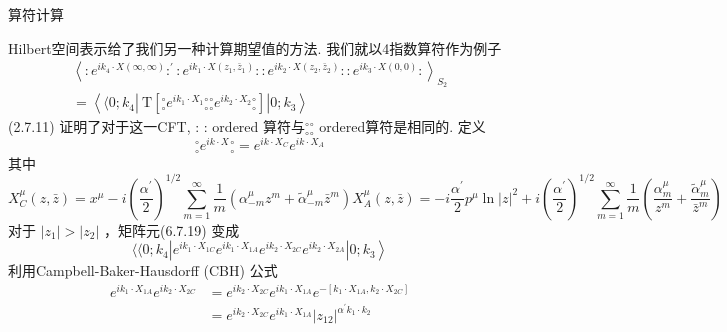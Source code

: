 \centerline{\Large 算符计算}
Hilbert空间表示给了我们另一种计算期望值的方法. 我们就以4指数算符作为例子
\begin{equation}
	\begin{gathered}
		\left\langle: e^{i k_{4} \cdot X(\infty, \infty)}:^{\prime}: e^{i k_{1} \cdot X\left(z_{1}, \bar{z}_{1}\right)}:: e^{i k_{2} \cdot X\left(z_{2}, \bar{z}_{2}\right)}:: e^{i k_{3} \cdot X(0,0)}:\right\rangle_{S_{2}} \\
		=\left\langle\langle 0 ; k_{4}\left|\mathrm{~T}\left[{}_\circ^\circ e^{i k_{1} \cdot X_{1}}{ }_\circ^\circ { }_\circ^\circ e^{i k_{2} \cdot X_{2} }{ }_\circ^\circ \right]\right| 0 ; k_{3}\right\rangle
	\end{gathered}
\end{equation}
(2.7.11) 证明了对于这一CFT, : : ordered 算符与${}_\circ^\circ {}_\circ^\circ$ ordered算符是相同的. 定义
\begin{equation}
	{ }_\circ^\circ e^{i k \cdot X_{ }}{ }_\circ^\circ=e^{i k \cdot X_{C}} e^{i k \cdot X_{A}}
\end{equation}
其中
\begin{subequations}
\begin{equation}
X_{C}^{\mu}(z, \bar{z})=x^{\mu}-i\left(\frac{\alpha^{\prime}}{2}\right)^{1 / 2} \sum_{m=1}^{\infty} \frac{1}{m}\left(\alpha_{-m}^{\mu} z^{m}+\tilde{\alpha}_{-m}^{\mu} \bar{z}^{m}\right) 
\end{equation}
\begin{equation}
X_{A}^{\mu}(z, \bar{z})=-i \frac{\alpha^{\prime}}{2} p^{\mu} \ln |z|^{2}+i\left(\frac{\alpha^{\prime}}{2}\right)^{1 / 2} \sum_{m=1}^{\infty} \frac{1}{m}\left(\frac{\alpha_{m}^{\mu}}{z^{m}}+\frac{\tilde{\alpha}_{m}^{\mu}}{\bar{z}^{m}}\right)
\end{equation}	
\end{subequations}
对于 $\left|z_{1}\right|>\left|z_{2}\right|$ ，矩阵元(6.7.19) 变成
\begin{equation}
	\left.\langle\langle 0 ; k_{4}\left|e^{i k_{1} \cdot X_{1 C}} e^{i k_{1} \cdot X_{1 A}} e^{i k_{2} \cdot X_{2 C}} e^{i k_{2} \cdot X_{2 A}}\right| 0 ; k_{3}\right\rangle
\end{equation}
利用Campbell-Baker-Hausdorff (CBH) 公式
\begin{equation}
	\begin{aligned}
		e^{i k_{1} \cdot X_{1 A}} e^{i k_{2} \cdot X_{2 C}} &=e^{i k_{2} \cdot X_{2 C}} e^{i k_{1} \cdot X_{1 A}} e^{-\left[k_{1} \cdot X_{1 A}, k_{2} \cdot X_{2 C}\right]} \\
		&=e^{i k_{2} \cdot X_{2 C}} e^{i k_{1} \cdot X_{1 A}}\left|z_{12}\right|^{\alpha^{\prime} k_{1} \cdot k_{2}}
	\end{aligned}
\end{equation}

